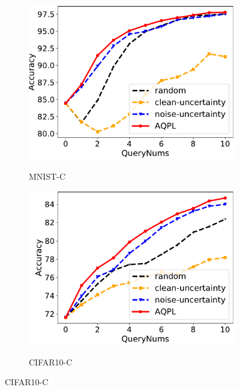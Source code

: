 \documentclass[letterpaper]{article} %
\begin{document}
\begin{figure}[!t]
	\centering
	
	\begin{subfigure}{0.3\linewidth}
		\centering
		\label{fig.Mnist.Gaussian}
		\includegraphics[width=1\textwidth]{img/Resnet18-Mnist-GuassianNoise.pdf}\\
		\caption{MNIST-C}
	\end{subfigure}
	\begin{subfigure}{0.3\linewidth}
		\centering
		\label{fig.Cifar10.Gaussian}
		\includegraphics[width=1\textwidth]{img/Resnet18-CIFAR10-GuassianNoise.pdf}\\
		\caption{CIFAR10-C}
	\end{subfigure}

\end{figure}
\end{document}
